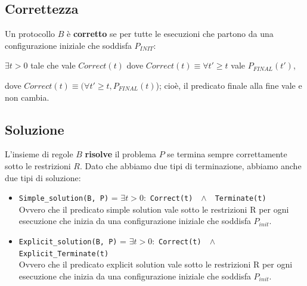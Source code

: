 \subsection{Correttezza}

\begin{definition}
    Un protocollo $B$ è \textbf{corretto} se per tutte le esecuzioni
    che partono da una configurazione iniziale che soddisfa $P_{INIT}$:


    \begin{center}
        $\exists t>0$ tale che vale $Correct(t)$ dove $Correct(t) \equiv \forall t'
            \geq t$ vale $P_{FINAL}(t')$,
    \end{center}

\end{definition}

dove $Correct(t) \equiv (\forall t' \ge t, P_{FINAL}(t)$); cioè, il predicato
finale alla fine vale e non cambia.

\subsection{Soluzione}
L'insieme di regole $B$ \textbf{risolve} il problema $P$ se termina sempre
correttamente sotto le restrizioni $R$. Dato che abbiamo due tipi di
terminazione, abbiamo anche due tipi di soluzione:
\begin{itemize}
    \item \texttt{Simple\_solution(B, P)} = $\exists t > 0 :$ \texttt{Correct(t)}
          $ ~~ \wedge ~~$ \texttt{Terminate(t)}\\
          Ovvero che il predicato simple solution vale sotto le restrizioni R per
          ogni esecuzione che inizia da una configurazione iniziale che soddisfa
          $P_{init}$.

    \item \texttt{Explicit\_solution(B, P)} = $\exists t > 0 :$
          \texttt{Correct(t)} $ ~~ \wedge ~~$ \texttt{Explicit\_Terminate(t)}\\
          Ovvero che il predicato explicit solution vale sotto le restrizioni R
          per ogni esecuzione che inizia da una configurazione iniziale che
          soddisfa $P_{init}$.
\end{itemize}

